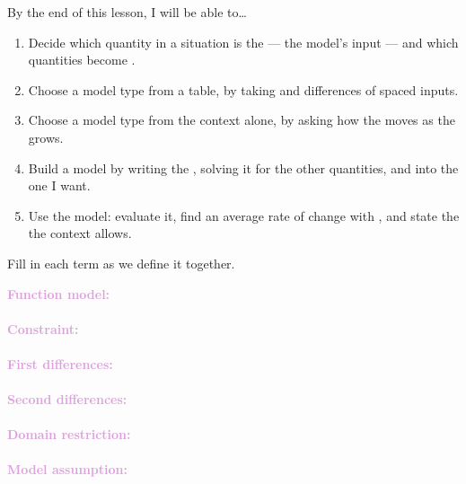\documentclass[10pt]{article}
\begin{document}

\vspace{0.12in}

\begin{objectivebox}
By the end of this lesson, I will be able to\ldots
\begin{enumerate}[itemsep=2pt]
  \item Decide which quantity in a situation is the \blank{2.2cm} --- the
        model's input --- and which quantities become \blank{2.2cm}.
  \item Choose a model type from a table, by taking \blank{1.8cm} and
        \blank{2cm} differences of \blank{2.4cm} spaced inputs.
  \item Choose a model type from the context alone, by asking how the
        \blank{1.8cm} moves as the \blank{2cm} grows.
  \item Build a model by writing the \blank{2.2cm}, solving it for the other
        quantities, and \blank{2.4cm} into the one I want.
  \item Use the model: evaluate it, find an average rate of change with
        \blank{1.6cm}, and state the \blank{2.2cm} the context allows.
\end{enumerate}
\end{objectivebox}

\vspace{0.1in}

\boxguard
\begin{vocabbox}
Fill in each term as we define it together.
\par\vspace{2pt}
\noindent\textbf{\textcolor{plum}{Function model:}}\\[1pt]
\writeline\\[3pt]
\noindent\textbf{\textcolor{plum}{Constraint:}}\\[1pt]
\writeline\\[3pt]
\noindent\textbf{\textcolor{plum}{First differences:}}\\[1pt]
\writeline\\[3pt]
\noindent\textbf{\textcolor{plum}{Second differences:}}\\[1pt]
\writeline\\[3pt]
\noindent\textbf{\textcolor{plum}{Domain restriction:}}\\[1pt]
\writeline\\[3pt]
\noindent\textbf{\textcolor{plum}{Model assumption:}}\\[1pt]
\writeline
\end{vocabbox}
\end{document}
